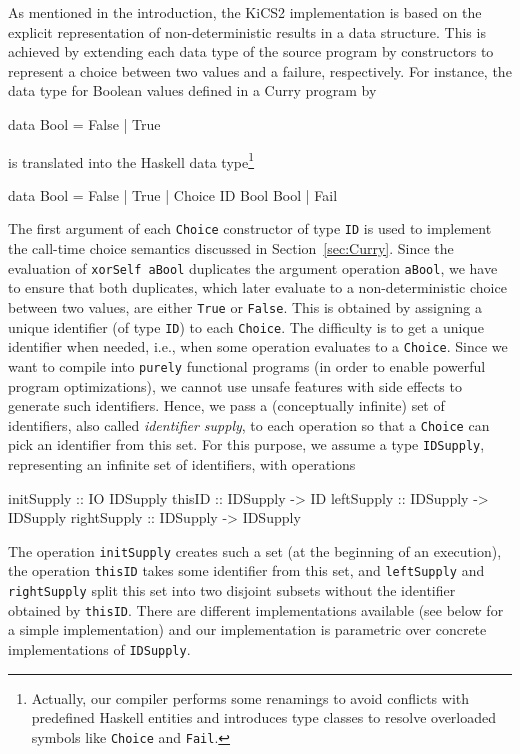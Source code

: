 \documentclass{llncs}
\newcommand{\code}[1]{\mbox{\small\texttt{#1}}}
\begin{document}
As mentioned in the introduction, the KiCS2 implementation
is based on the explicit representation of non-deterministic results
in a data structure.
This is achieved by extending each data type of the source program
by constructors to represent a choice between two values
and a failure, respectively.
For instance, the data type for Boolean values defined in a Curry program by
\begin{curry}
  data Bool = False | True
\end{curry}
is translated into the Haskell data type\footnote{Actually,
our compiler performs some renamings to avoid conflicts with
predefined Haskell entities and introduces type classes
to resolve overloaded symbols like \code{Choice} and \code{Fail}.}
\begin{haskell}
  data Bool = False | True | Choice ID Bool Bool | Fail
\end{haskell}
The first argument of each \code{Choice} constructor of type \code{ID}
is used to implement the call-time choice semantics
discussed in Section~\ref{sec:Curry}.
Since the evaluation of \code{xorSelf aBool} duplicates
the argument operation \code{aBool}, we have to ensure
that both duplicates, which later evaluate to a non-deterministic
choice between two values, are either \code{True} or \code{False}.
This is obtained by assigning a unique identifier (of type \code{ID})
to each \code{Choice}. The difficulty is to get a unique identifier
when needed, i.e., when some operation evaluates to a \code{Choice}.
Since we want to compile into \code{purely} functional programs
(in order to enable powerful program optimizations),
we cannot use unsafe features with side effects to generate
such identifiers.
Hence, we pass a (conceptually infinite) set of identifiers,
also called \emph{identifier supply},
to each operation so that a \code{Choice} can pick an identifier from
this set.
For this purpose, we assume a type \code{IDSupply},
representing an infinite set of identifiers,
with operations
\begin{haskell}
  initSupply  :: IO IDSupply
  thisID      :: IDSupply -> ID
  leftSupply  :: IDSupply -> IDSupply
  rightSupply :: IDSupply -> IDSupply
\end{haskell}
The operation \code{initSupply} creates such a set (at the beginning
of an execution),
the operation \code{thisID} takes some identifier from this set, and
\code{leftSupply} and \code{rightSupply} split this set
into two disjoint subsets without the identifier
obtained by \code{thisID}.
There are different implementations available \cite{AugustssonRittriSynek94}
(see below for a simple implementation) and our implementation
is parametric over concrete implementations of \code{IDSupply}.
\end{document}
